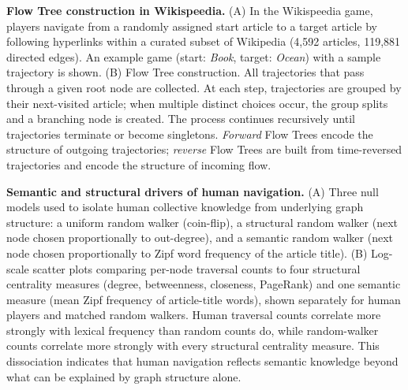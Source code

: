 
\caption{\textbf{Flow Tree construction in Wikispeedia.}
(A) In the Wikispeedia game, players navigate from a randomly assigned start article
to a target article by following hyperlinks within a curated subset of Wikipedia
(4,592 articles, 119,881 directed edges).
An example game (start: \textit{Book}, target: \textit{Ocean}) with a sample
trajectory is shown.
(B) Flow Tree construction.
All trajectories that pass through a given root node are collected.
At each step, trajectories are grouped by their next-visited article; when multiple
distinct choices occur, the group splits and a branching node is created.
The process continues recursively until trajectories terminate or become singletons.
\textit{Forward} Flow Trees encode the structure of outgoing trajectories;
\textit{reverse} Flow Trees are built from time-reversed trajectories and encode
the structure of incoming flow.
}



\caption{\textbf{Semantic and structural drivers of human navigation.}
(A) Three null models used to isolate human collective knowledge from underlying
graph structure: a uniform random walker (coin-flip), a structural random walker
(next node chosen proportionally to out-degree), and a semantic random walker
(next node chosen proportionally to Zipf word frequency of the article title).
(B) Log-scale scatter plots comparing per-node traversal counts to four structural
centrality measures (degree, betweenness, closeness, PageRank) and one semantic
measure (mean Zipf frequency of article-title words), shown separately for human
players and matched random walkers.
Human traversal counts correlate more strongly with lexical frequency than random
counts do, while random-walker counts correlate more strongly with every structural
centrality measure.
This dissociation indicates that human navigation reflects semantic knowledge
beyond what can be explained by graph structure alone.
}


